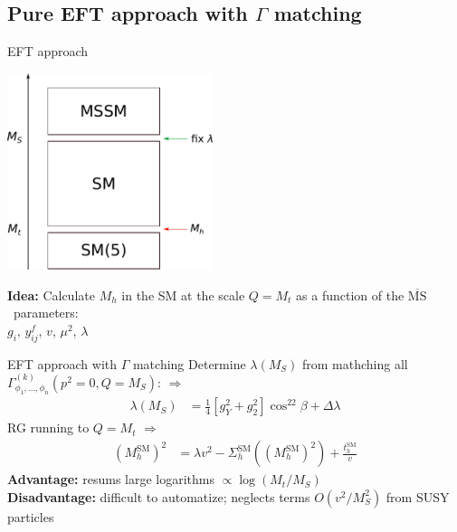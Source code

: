 \documentclass[hyperref={pdfpagelabels=false},ngerman]{beamer}
\renewcommand{\emph}{\textbf}
\newcommand{\MSbar}{\ensuremath{\overline{\text{MS}}}}
\newcommand{\SM}{\ensuremath{\text{SM}}}
\begin{document}

\subsection{Pure EFT approach with $\Gamma$ matching}

\begin{frame}{EFT approach}
  \begin{center}
    \includegraphics[width=0.45\textwidth]{images/mssm-sm-tower-eft}\\[1em]
  \end{center}
  \emph{Idea:} Calculate $M_h$ in the SM at the scale $Q = M_t$ as a function of the \MSbar\ parameters:\\[1em]
  \centering $g_i$, $y^f_{ij}$, $v$, $\mu^2$, $\lambda$
\end{frame}


\begin{frame}{EFT approach with $\Gamma$ matching}
  Determine $\lambda(M_S)$ from mathching all
  $\Gamma_{\phi_1,\ldots,\phi_n}^{(k)}(p^2 = 0, Q = M_S)$: $\Rightarrow$
  \begin{align*}
    \lambda (M_S) &= \frac{1}{4}\left[g_Y^{2} + g_2^2\right] \cos^22\beta
    + \Delta \lambda
  \end{align*}
  RG running to $Q=M_t$ $\Rightarrow$
  \begin{align*}
    (M_h^\SM)^2 &= \lambda v^2 - \Sigma^\SM_h((M_h^\SM)^2) + \frac{t_h^\SM}{v}
  \end{align*}
  \emph{Advantage:} resums large logarithms $\propto\log(M_t/M_S)$\\
  \emph{Disadvantage:} difficult to automatize; neglects terms
  $O(v^2/M_S^2)$ from SUSY particles
\end{frame}

\end{document}
